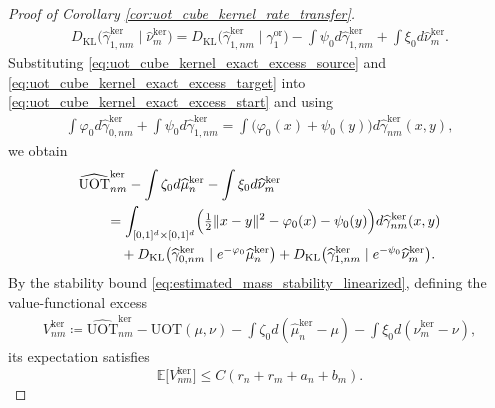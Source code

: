 \documentclass[11pt,reqno]{amsart}
\theoremstyle{definition}
\newcommand{\KL}{\mathrm{KL}}
\renewcommand{\hat}{\widehat}
\newcommand{\Ep}{\mathbb{E}}
\begin{document}
\begin{proof}[Proof of Corollary \ref{cor:uot_cube_kernel_rate_transfer}]
\begin{align}
    {D_\KL}\bigl(\hat\gamma_{1,nm}^{\mathrm{ker}}\mid \hat\nu_m^{\mathrm{ker}}\bigr)
    =
    {D_\KL}\bigl(\hat\gamma_{1,nm}^{\mathrm{ker}}\mid \gamma_1^{\mathrm{or}}\bigr)
    - \int \psi_0 d\hat\gamma_{1,nm}^{\mathrm{ker}}
    + \int \xi_0 d\hat\nu_m^{\mathrm{ker}}.
\end{align}
Substituting \eqref{eq:uot_cube_kernel_exact_excess_source} and \eqref{eq:uot_cube_kernel_exact_excess_target} into \eqref{eq:uot_cube_kernel_exact_excess_start} and using
\begin{align*}
    \int \varphi_0 d\hat\gamma_{0,nm}^{\mathrm{ker}} + \int \psi_0 d\hat\gamma_{1,nm}^{\mathrm{ker}}
    =
    \int \bigl(\varphi_0(x)+\psi_0(y)\bigr) d\hat\gamma_{nm}^{\mathrm{ker}}(x,y),
\end{align*}
we obtain
\begin{align}
\label{eq:uot_cube_kernel_exact_excess}
\begin{aligned}
&\widehat{\mathrm{UOT}}_{nm}^{\mathrm{ker}}
- \int \zeta_0 d\hat\mu_n^{\mathrm{ker}}
- \int \xi_0 d\hat\nu_m^{\mathrm{ker}} \\
&\qquad=
\int_{[0,1]^d\times[0,1]^d}
\Bigl(
\tfrac{1}{2}\|x-y\|^2-\varphi_0(x)-\psi_0(y)
\Bigr)
 d\hat\gamma_{nm}^{\mathrm{ker}}(x,y) \\
&\qquad\quad
+ {D_\KL}\bigl(\hat\gamma_{0,nm}^{\mathrm{ker}}\mid e^{-\varphi_0}\hat\mu_n^{\mathrm{ker}}\bigr)
+ {D_\KL}\bigl(\hat\gamma_{1,nm}^{\mathrm{ker}}\mid e^{-\psi_0}\hat\nu_m^{\mathrm{ker}}\bigr).
\end{aligned}
\end{align}
By the stability bound \eqref{eq:estimated_mass_stability_linearized}, defining the value-functional excess
\begin{align}
\label{eq:uot_cube_kernel_value_gap}
    V_{nm}^{\mathrm{ker}}
    \coloneqq
    \widehat{\mathrm{UOT}}_{nm}^{\mathrm{ker}}
    -\mathrm{UOT}(\mu,\nu)
    -\int\zeta_0 d(\hat\mu_n^{\mathrm{ker}}-\mu)
    -\int\xi_0 d(\hat\nu_m^{\mathrm{ker}}-\nu),
\end{align}
its expectation satisfies
\begin{equation}
\label{eq:uot_cube_kernel_value_expansion_expect}
\Ep\bigl[V_{nm}^{\mathrm{ker}}\bigr]
\le
C(r_n+r_m+a_n+b_m).
\end{equation}


\end{proof}
\end{document}
